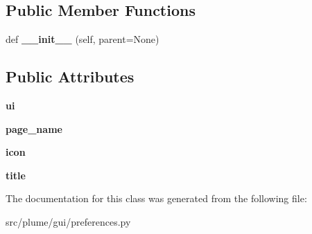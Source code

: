 \subsection*{Public Member Functions}
\begin{DoxyCompactItemize}
\item 
def {\bfseries \+\_\+\+\_\+init\+\_\+\+\_\+} (self, parent=None)\hypertarget{classplume-creator_1_1src_1_1plume_1_1gui_1_1preferences_1_1_themes_preferences_aac16b4b492346adc8ad72a4d7ab0fbe2}{}\label{classplume-creator_1_1src_1_1plume_1_1gui_1_1preferences_1_1_themes_preferences_aac16b4b492346adc8ad72a4d7ab0fbe2}

\end{DoxyCompactItemize}
\subsection*{Public Attributes}
\begin{DoxyCompactItemize}
\item 
{\bfseries ui}\hypertarget{classplume-creator_1_1src_1_1plume_1_1gui_1_1preferences_1_1_themes_preferences_acf3478d541368e19f7b30290572ee4a5}{}\label{classplume-creator_1_1src_1_1plume_1_1gui_1_1preferences_1_1_themes_preferences_acf3478d541368e19f7b30290572ee4a5}

\item 
{\bfseries page\+\_\+name}\hypertarget{classplume-creator_1_1src_1_1plume_1_1gui_1_1preferences_1_1_themes_preferences_a1db97b07d202f6f9c525e6685c0cc01b}{}\label{classplume-creator_1_1src_1_1plume_1_1gui_1_1preferences_1_1_themes_preferences_a1db97b07d202f6f9c525e6685c0cc01b}

\item 
{\bfseries icon}\hypertarget{classplume-creator_1_1src_1_1plume_1_1gui_1_1preferences_1_1_themes_preferences_ad26f0ac6b46f2be4ceeb05695163775a}{}\label{classplume-creator_1_1src_1_1plume_1_1gui_1_1preferences_1_1_themes_preferences_ad26f0ac6b46f2be4ceeb05695163775a}

\item 
{\bfseries title}\hypertarget{classplume-creator_1_1src_1_1plume_1_1gui_1_1preferences_1_1_themes_preferences_a7e7cc2ce75ac6d2f48150c96e2ed8628}{}\label{classplume-creator_1_1src_1_1plume_1_1gui_1_1preferences_1_1_themes_preferences_a7e7cc2ce75ac6d2f48150c96e2ed8628}

\end{DoxyCompactItemize}


The documentation for this class was generated from the following file\+:\begin{DoxyCompactItemize}
\item 
src/plume/gui/preferences.\+py\end{DoxyCompactItemize}

